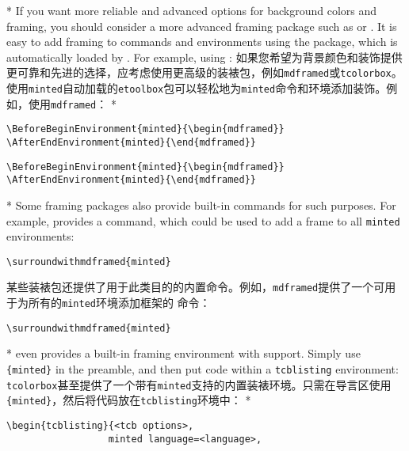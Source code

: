 \begin{optionlist}
\begin{paracol}{2}
\switchcolumn[0]*%
If you want more reliable and advanced options for background colors and framing, you should consider a more advanced framing package such as  or .  It is easy to add framing to  commands and environments using the  package, which is automatically loaded by .  For example, using :
\switchcolumn
如果您希望为背景颜色和装饰提供更可靠和先进的选择，应考虑使用更高级的装裱包，例如\texttt{mdframed}或\texttt{tcolorbox}。使用\texttt{minted}自动加载的\texttt{etoolbox}包可以轻松地为\texttt{minted}命令和环境添加装饰。例如，使用\texttt{mdframed}：
\switchcolumn[0]*%
\begin{Verbatim}
\BeforeBeginEnvironment{minted}{\begin{mdframed}}
\AfterEndEnvironment{minted}{\end{mdframed}}
\end{Verbatim}
\switchcolumn
\begin{Verbatim}
\BeforeBeginEnvironment{minted}{\begin{mdframed}}
\AfterEndEnvironment{minted}{\end{mdframed}}
\end{Verbatim}
\switchcolumn[0]*%
Some framing packages also provide built-in commands for such purposes.  For example,  provides a \texttt{\string\surroundwithmdframed} command, which could be used to add a frame to all \texttt{minted} environments:
\begin{Verbatim}
\surroundwithmdframed{minted}
\end{Verbatim}
\switchcolumn
某些装裱包还提供了用于此类目的的内置命令。例如，\texttt{mdframed}提供了一个可用于为所有的\texttt{minted}环境添加框架的
\texttt{\string\surroundwithmdframed}命令：
\begin{Verbatim}
\surroundwithmdframed{minted}
\end{Verbatim}
\switchcolumn[0]*%
 even provides a built-in framing environment with  support.  Simply use \texttt{\string\tcbuselibrary\{minted\}} in the preamble, and then put code within a \texttt{tcblisting} environment:
\switchcolumn
\texttt{tcolorbox}甚至提供了一个带有\texttt{minted}支持的内置装裱环境。只需在导言区使用\texttt{\string\tcbuselibrary\{minted\}}，然后将代码放在\texttt{tcblisting}环境中：
\switchcolumn[0]*%
\begin{Verbatim}
\begin{tcblisting}{<tcb options>,
                  minted language=<language>,

\end{Verbatim}
\end{paracol}
\end{optionlist}
